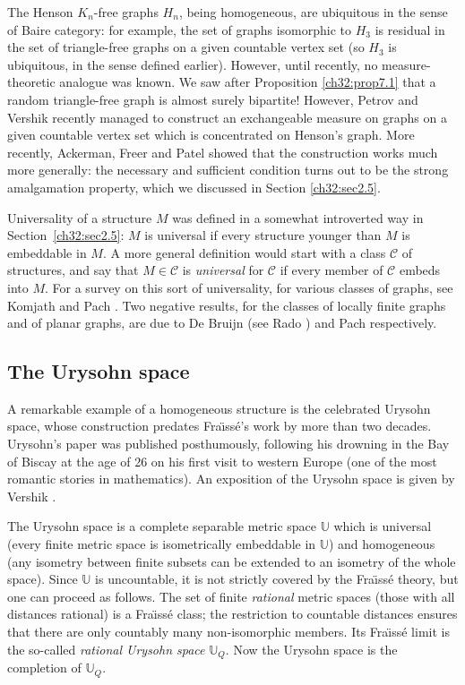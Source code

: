 \documentclass[12pt]{article}
\begin{document}
The Henson $K_n$-free graphs $H_n$, being homogeneous, are ubiquitous in the 
sense of Baire category: for example, the set of graphs isomorphic to $H_3$
is residual in the set of triangle-free graphs on a given countable vertex
set (so $H_3$ is ubiquitous, in the sense defined earlier). However, until
recently, no measure-theoretic analogue was known. We saw after Proposition
\ref{ch32:prop7.1} that a random triangle-free graph is almost surely
bipartite! However, Petrov and Vershik \cite{ch32:new13} recently
managed to construct
an exchangeable measure on graphs on a given countable vertex set which is
concentrated on Henson's graph. More recently, Ackerman, Freer and Patel
showed that the construction works much more generally: the necessary and
sufficient condition turns out to be the strong amalgamation property, which
we discussed in Section \ref{ch32:sec2.5}.

Universality of a structure $M$ was defined in a somewhat
introverted way in Section~\ref{ch32:sec2.5}: $M$ is universal if
every structure younger than $M$ is embeddable in $M$. A more
general definition would start with a class $\mathcal{C}$ of
structures, and say that $M \in \mathcal{C}$ is \emph{universal}
for $\mathcal{C}$ if every member of $\mathcal{C}$ embeds into $M$.
For a survey on this sort of universality, for
various classes of graphs, see Komjath and Pach \cite{ch32:bib33}.
Two negative results, for the classes of locally finite graphs and
of planar graphs, are due to De Bruijn (see Rado \cite{ch32:bib42})
and Pach \cite{ch32:bib40} respectively.

\subsection{The Urysohn space}

A remarkable example of a homogeneous structure is the celebrated
Urysohn space, whose construction predates Fra\"{\i}ss\'e's work by
more than two decades. Urysohn's paper \cite{ch32:new16} was published
posthumously, following his drowning in the Bay of Biscay at the age of
26 on his first visit to western Europe (one of the most romantic stories
in mathematics). An exposition of the Urysohn space is given by 
Vershik \cite{ch32:new17}.

The Urysohn space is a complete separable metric space $\mathbb{U}$ which
is universal (every finite metric space is isometrically embeddable in
$\mathbb{U}$) and homogeneous (any isometry between finite subsets can be
extended to an isometry of the whole space). Since $\mathbb{U}$ is
uncountable, it is not strictly covered by the Fra\"{\i}ss\'e theory, but
one can proceed as follows. The set of finite \emph{rational} metric
spaces (those with all distances rational) is a Fra\"{\i}ss\'e class;
the restriction to countable distances ensures that there are only countably
many non-isomorphic members. Its Fra\"{\i}ss\'e limit is the so-called
\emph{rational Urysohn space} $\mathbb{U}_Q$. Now the Urysohn space is the
completion of $\mathbb{U}_Q$.
\end{document}
